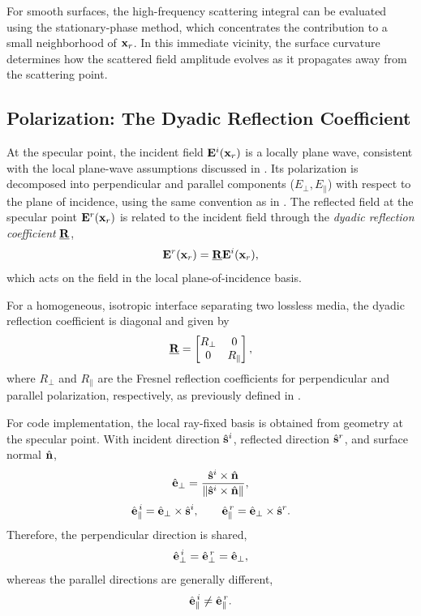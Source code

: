 For smooth surfaces, the high-frequency scattering integral can be evaluated using the stationary-phase method, which concentrates the contribution to a small neighborhood of $\mathbf{x}_r$. In this immediate vicinity, the surface curvature determines how the scattered field amplitude evolves as it propagates away from the scattering point.

\subsection{Polarization: The Dyadic Reflection Coefficient}

At the specular point, the incident field $\mathbf{E}^i(\mathbf{x}_r)$ is a locally plane wave, consistent with the local plane-wave assumptions discussed in . Its polarization is decomposed into perpendicular and parallel components ($E_{\perp}, E_{\parallel}$) with respect to the plane of incidence, using the same convention as in . The reflected field at the specular point $\mathbf{E}^r(\mathbf{x}_r)$ is related to the incident field through the \emph{dyadic reflection coefficient} $\underline{\mathbf{R}}$,
\begin{equation}
  \mathbf{E}^r(\mathbf{x}_r) = \underline{\mathbf{R}} \mathbf{E}^i(\mathbf{x}_r),\label{eq:dyadic-reflection}
\end{equation}
which acts on the field in the local plane-of-incidence basis.

For a homogeneous, isotropic interface separating two lossless media, the dyadic reflection coefficient is diagonal and given by
\begin{equation}
  \underline{\mathbf{R}} =
  \begin{bmatrix}
    R_{\perp} & 0 \\
    0 & R_{\parallel}
  \end{bmatrix},\label{eq:fresnel-matrix}
\end{equation}
where $R_{\perp}$ and $R_{\parallel}$ are the Fresnel reflection coefficients for perpendicular and parallel polarization, respectively, as previously defined in .

For code implementation, the local ray-fixed basis is obtained from geometry at the specular point. With incident direction $\hat{\mathbf{s}}^i$, reflected direction $\hat{\mathbf{s}}^r$, and surface normal $\hat{\mathbf{n}}$,
\begin{equation}
  \hat{\mathbf{e}}_{\perp} = \frac{\hat{\mathbf{s}}^i \times \hat{\mathbf{n}}}{\|\hat{\mathbf{s}}^i \times \hat{\mathbf{n}}\|},
\end{equation}
\begin{equation}
  \hat{\mathbf{e}}_{\parallel}^{\,i} = \hat{\mathbf{e}}_{\perp} \times \hat{\mathbf{s}}^i, \qquad
  \hat{\mathbf{e}}_{\parallel}^{\,r} = \hat{\mathbf{e}}_{\perp} \times \hat{\mathbf{s}}^r.
\end{equation}
Therefore, the perpendicular direction is shared,
\begin{equation}
  \hat{\mathbf{e}}_{\perp}^{\,i} = \hat{\mathbf{e}}_{\perp}^{\,r} = \hat{\mathbf{e}}_{\perp},
\end{equation}
whereas the parallel directions are generally different,
\begin{equation}
  \hat{\mathbf{e}}_{\parallel}^{\,i} \neq \hat{\mathbf{e}}_{\parallel}^{\,r}.
\end{equation}


